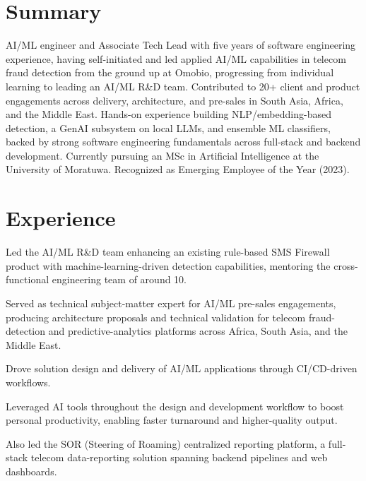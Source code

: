 \documentclass[10.5pt]{article}
\begin{document}

\section*{Summary}
AI/ML engineer and Associate Tech Lead with five years of software engineering experience, having self-initiated and led applied AI/ML capabilities in telecom fraud detection from the ground up at Omobio, progressing from individual learning to leading an AI/ML R\&D team. Contributed to 20+ client and product engagements across delivery, architecture, and pre-sales in South Asia, Africa, and the Middle East. Hands-on experience building NLP/embedding-based detection, a GenAI subsystem on local LLMs, and ensemble ML classifiers, backed by strong software engineering fundamentals across full-stack and backend development. Currently pursuing an MSc in Artificial Intelligence at the University of Moratuwa. Recognized as Emerging Employee of the Year (2023).

\section*{Experience}

\begin{cvitems}
  \item Led the AI/ML R\&D team enhancing an existing rule-based SMS Firewall product with machine-learning-driven detection capabilities, mentoring the cross-functional engineering team of around 10.
  \item Served as technical subject-matter expert for AI/ML pre-sales engagements, producing architecture proposals and technical validation for telecom fraud-detection and predictive-analytics platforms across Africa, South Asia, and the Middle East.
  \item Drove solution design and delivery of AI/ML applications through CI/CD-driven workflows.
  \item Leveraged AI tools throughout the design and development workflow to boost personal productivity, enabling faster turnaround and higher-quality output.
  \item Also led the SOR (Steering of Roaming) centralized reporting platform, a full-stack telecom data-reporting solution spanning backend pipelines and web dashboards.
\end{cvitems}
\end{document}
